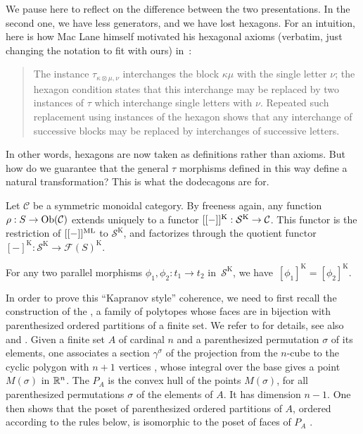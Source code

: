 We pause here to reflect on the difference between the two presentations. In the second one, we have less generators, and we have lost hexagons. For an intuition, here is how Mac Lane himself motivated his hexagonal axioms (verbatim, just changing the notation to fit with ours) in~\cite{MacLane63}:
\begin{quote}
    \label{q:ML}
The instance $\tau_{\kappa\otimes \mu,\nu}$ interchanges the block $\kappa\mu$ with the single letter $\nu$; the hexagon condition states that this interchange may be replaced by two instances of $\tau$ which interchange single letters with $\nu$. Repeated such replacement using instances of the hexagon shows that any interchange of successive blocks may be replaced by interchanges of successive letters.
\end{quote}
In other words, hexagons are now taken as definitions rather than axioms. 
But how do we guarantee that the  general $\tau$ morphisms defined in this way define a natural transformation? 
This is what the dodecagons are for.

Let $\mathcal{C}$  be a symmetric monoidal category. 
By freeness again, any function $\rho : S \to \mathrm{Ob}(\mathcal{C})$ extends uniquely to a functor $[[-]]^{\mathrm{K}}:\mathcal{S}^{\mathrm{K}} \to \mathcal{C}$.
This functor is the restriction of $[[-]]^{\mathrm{ML}}$ to $\mathcal{S}^{\mathrm{K}}$, and factorizes through the quotient functor $[-]^{\mathrm{K}}:\mathcal{S}^{\mathrm{K}}\to  \mathcal{F}(S)^{\mathrm{K}}$.
\begin{thm}
\label{thm:coherence-Kapranov}
 For any two parallel morphisms $\phi_1,\phi_2: t_1 \to t_2$ in~$\mathcal{S}^{\mathrm{K}}$, we have~$[\phi_1]^{\mathrm{K}}=[\phi_2]^{\mathrm{K}}$.
\end{thm}

In order to prove this ``Kapranov style'' coherence, we need to first recall the construction of the , a family of polytopes whose faces are in bijection with parenthesized ordered partitions of a finite set.
We refer to \cite[Sec.~9.3]{Ziegler95} for details, see also \cite{kapranov1993} and \cite{reinerCoxeterassociahedra1994}.
Given a finite set $A$ of cardinal $n$ and a parenthesized permutation $\sigma$ of its elements, one associates a section $\gamma^\sigma$ of the projection from the $n$-cube to the cyclic polygon with $n+1$ vertices \cite[Ex.~9.14]{Ziegler95}, whose integral over the base gives a point~$M(\sigma)$ in $\mathbb R^n$. 
The  $P_A$ is the convex hull of the points $M(\sigma)$, for all parenthesized permutations $\sigma$ of the elements of $A$. 
It has dimension $n-1$. 
One then shows that the poset of parenthesized ordered partitions of $A$, ordered according to the rules below, is isomorphic to the poset of faces of $P_A$ \cite[Thm.~9.15]{Ziegler95}.


